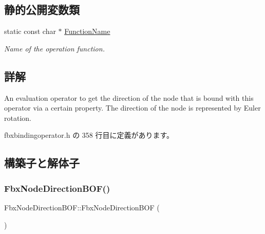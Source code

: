 \subsection*{静的公開変数類}
\begin{DoxyCompactItemize}
\item 
static const char $\ast$ \hyperlink{class_fbx_node_direction_b_o_f_a653e830c1b1480a48f55cd980fe54f91}{Function\+Name}
\begin{DoxyCompactList}\small\item\em Name of the operation function. \end{DoxyCompactList}\end{DoxyCompactItemize}


\subsection{詳解}
An evaluation operator to get the direction of the node that is bound with this operator via a certain property. The direction of the node is represented by Euler rotation. 

 fbxbindingoperator.\+h の 358 行目に定義があります。



\subsection{構築子と解体子}
\mbox{\label{class_fbx_node_direction_b_o_f_a8e7616976dab63af690ea44d96f10813}} 
\subsubsection{\texorpdfstring{Fbx\+Node\+Direction\+B\+O\+F()}{FbxNodeDirectionBOF()}}
{\footnotesize\ttfamily Fbx\+Node\+Direction\+B\+O\+F\+::\+Fbx\+Node\+Direction\+B\+OF (\begin{DoxyParamCaption}{ }\end{DoxyParamCaption})}

\mbox{\label{class_fbx_node_direction_b_o_f_a68e309ed65613ce119511f57fcc9ac91}} 
